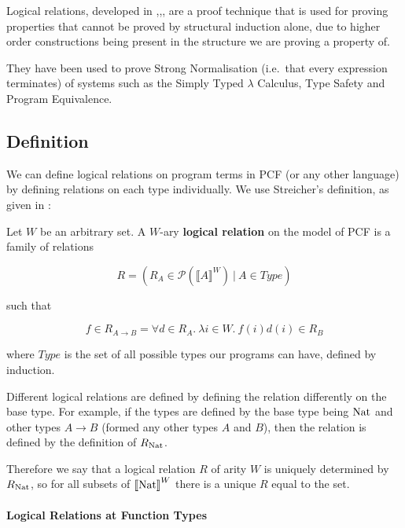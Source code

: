 Logical relations, developed in \citep{Tait67},\citep{Plotkin73},\citep{Statman85}, are a proof technique that is used for proving properties that cannot be proved by structural induction alone, due to higher order constructions being present in the structure we are proving a property of.

They have been used to prove Strong Normalisation (i.e.\ that every expression terminates) of systems such as the Simply Typed $\lambda$ Calculus, Type Safety and Program Equivalence.

\subsection{Definition}
We can define logical relations on program terms in PCF (or any other language) by defining relations on each type individually. We use Streicher's definition, as given in \citep{Streicher06}: 

\vspace{0.5cm}

\begin{defn}
Let $W$ be an arbitrary set.  A $W$-ary \textbf{logical relation} on the model of PCF is a family of relations

\[R = (R_A \in \mathcal{P}(\llbracket A \rrbracket^W) \ | \ A \in Type)\]

such that

\[f \in R_{A \to B} = \forall d \in R_A. \ \lambda i \in W. \ f(i)d(i) \in R_B\]
\end{defn}

where $Type$ is the set of all possible types our programs can have, defined by induction.

Different logical relations are defined by defining the relation differently on  the base type. For example, if the types are defined by the base type being $\operatorname{Nat}$ and other types $A \to B$ (formed any other types $A$ and $B$), then the relation is defined by the definition of $R_{\operatorname{Nat}}$.

Therefore we say that a logical relation $R$ of arity $W$ is uniquely determined by $R_{\operatorname{Nat}}$, so for all subsets of ${\llbracket \operatorname{Nat} \rrbracket}^W$ there is a unique $R$ equal to the set. 

\vspace{0.5cm}

\paragraph{Logical Relations at Function Types}

